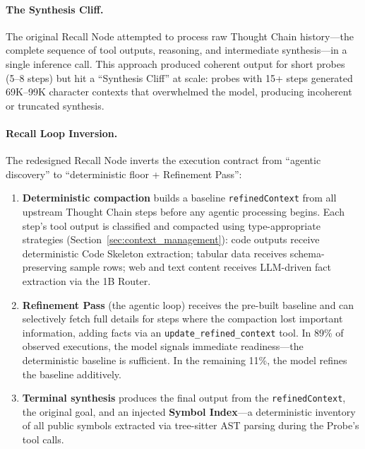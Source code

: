 \documentclass{article}
\begin{document}
\paragraph{The Synthesis Cliff.}
The original Recall Node attempted to process raw Thought Chain history---the complete sequence of tool outputs, reasoning, and intermediate synthesis---in a single inference call.
This approach produced coherent output for short probes (5--8 steps) but hit a ``Synthesis Cliff'' at scale: probes with 15+ steps generated 69K--99K character contexts that overwhelmed the model, producing incoherent or truncated synthesis.

\paragraph{Recall Loop Inversion.}
The redesigned Recall Node inverts the execution contract from ``agentic discovery'' to ``deterministic floor + Refinement Pass'':

\begin{enumerate}[leftmargin=*]
\item \textbf{Deterministic compaction} builds a baseline \texttt{refinedContext} from all upstream Thought Chain steps before any agentic processing begins.
Each step's tool output is classified and compacted using type-appropriate strategies (Section~\ref{sec:context_management}):
code outputs receive deterministic Code Skeleton extraction;
tabular data receives schema-preserving sample rows;
web and text content receives LLM-driven fact extraction via the 1B Router.

\item \textbf{Refinement Pass} (the agentic loop) receives the pre-built baseline and can selectively fetch full details for steps where the compaction lost important information, adding facts via an \texttt{update\_refined\_context} tool.
In 89\% of observed executions, the model signals immediate readiness---the deterministic baseline is sufficient.
In the remaining 11\%, the model refines the baseline additively.

\item \textbf{Terminal synthesis} produces the final output from the \texttt{refinedContext}, the original goal, and an injected \textbf{Symbol Index}---a deterministic inventory of all public symbols extracted via tree-sitter AST parsing during the Probe's tool calls.
\end{enumerate}
\end{document}
